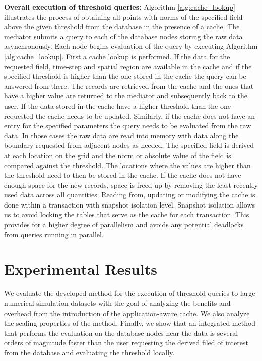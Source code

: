 \documentclass{sig-alternate}
\begin{document}
{\bf Overall execution of threshold queries:} Algorithm \ref{alg:cache_lookup} illustrates the process of obtaining all points with norms of the specified field
above the given threshold from the database in the presence of a cache. 
The mediator submits a query to each of the database nodes storing the raw data
asynchronously. Each node begins evaluation of the query by executing Algorithm \ref{alg:cache_lookup}. 
First a cache lookup is performed.
If the data for the requested field, time-step and spatial region
are available in the cache and if the specified threshold is higher than the one stored in the cache the query can be answered from there. The records are
retrieved from the cache and the ones that have a higher value are returned to the mediator and subsequently back to the user. If the data stored in the
cache have a higher threshold than the one requested the cache needs to be updated. Similarly, if the cache does not have an entry for the specified 
parameters the query needs to be evaluated from the raw data. In those cases the raw data are read into memory with data along the boundary requested
from adjacent nodes as needed. The specified field is derived at each location on the grid and the norm or absolute value of the field is
compared against the threshold. The locations where the values are higher than the threshold need to then be stored in the cache. If the cache does not
have enough space for the new records, space is freed up by removing the least recently used data across all quantities. Reading from, updating or
modifying the cache is done within a transaction with snapshot isolation level. Snapshot isolation allows us to avoid locking the tables that serve as the 
cache for each transaction. This provides for a higher degree of parallelism and avoids any potential deadlocks from queries running in parallel.

\section{Experimental Results}
We evaluate the developed method for the execution of threshold queries to large numerical simulation datasets with the goal of analyzing the 
benefits and overhead from the introduction of the application-aware cache. We also analyze the scaling properties of the method. Finally, we show
that an integrated method that performs the evaluation on the database nodes near the data is several orders of magnitude faster than the
user requesting the derived filed of interest from the database and evaluating the threshold locally.
\end{document}
